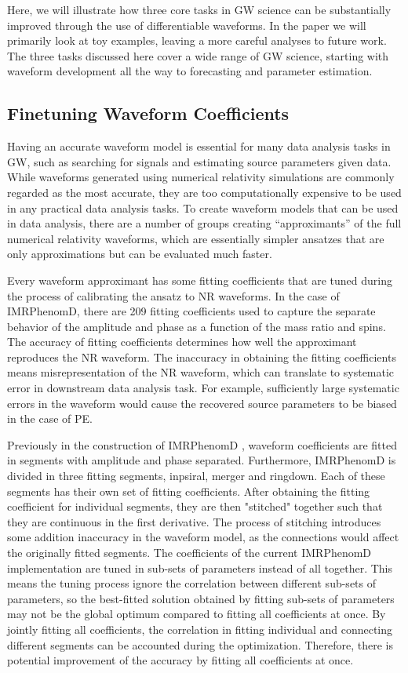 \documentclass[twocolumn]{aastex631}
\begin{document}
Here, we will illustrate how three core tasks in GW science can be substantially improved through the use of differentiable waveforms.
In the paper we will primarily look at toy examples, leaving a more careful analyses to future work. 
The three tasks discussed here cover a wide range of GW science, starting with waveform development all the way to forecasting and parameter estimation.

\subsection{Finetuning Waveform Coefficients}
\label{subsec:coeffs}

Having an accurate waveform model is essential for many data analysis tasks in
GW, such as searching for signals and estimating source parameters given data.
While waveforms generated using numerical relativity simulations are commonly
regarded as the most accurate, they are too computationally expensive to be used
in any practical data analysis tasks. To create waveform models that can be used
in data analysis, there are a number of groups creating ``approximants'' of the
full numerical relativity waveforms, which are essentially simpler ansatzes that
are only approximations but can be evaluated much faster. 

Every waveform approximant has some fitting coefficients that are tuned during
the process of calibrating the ansatz to NR waveforms. In the case of
IMRPhenomD, there are 209 fitting coefficients used to capture the separate
behavior of the amplitude and phase as a function of the mass ratio and spins.
The accuracy of fitting coefficients determines how well the approximant
reproduces the NR waveform. The inaccuracy in obtaining the fitting coefficients
means misrepresentation of the NR waveform, which can translate to systematic
error in downstream data analysis task. For example, sufficiently large
systematic errors in the waveform would cause the recovered source parameters to be biased
in the case of PE.

Previously in the construction of IMRPhenomD \citep{Khan:2015jqa}, waveform
coefficients are fitted in segments with amplitude and phase separated.
Furthermore, IMRPhenomD is divided in three fitting segments, inpsiral, merger and ringdown.
Each of these segments has their own set of fitting coefficients.
After obtaining the fitting coefficient for individual segments, they are then
"stitched" together such that they are continuous in the first derivative.
The process of stitching introduces some addition
inaccuracy in the waveform model, as the connections would affect the originally
fitted segments.
The coefficients of the current IMRPhenomD implementation are tuned in sub-sets
of parameters instead of all together. This means the tuning process ignore the
correlation between different sub-sets of parameters, so the best-fitted
solution obtained by fitting sub-sets of parameters may not be the global
optimum compared to fitting all coefficients at once. By jointly
fitting all coefficients, the correlation in fitting individual and connecting
different segments can be accounted during the optimization. Therefore, there is
potential improvement of the accuracy by fitting all coefficients at once.
\end{document}
